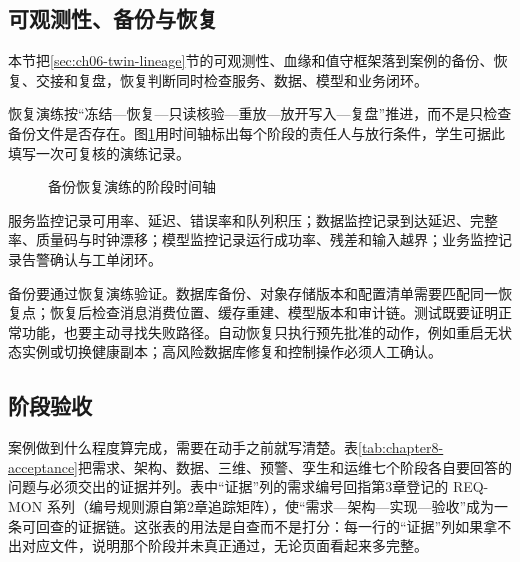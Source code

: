 \subsection{可观测性、备份与恢复}\label{sec:ch08-twin-lineage}

本节把\ref{sec:ch06-twin-lineage}节的可观测性、血缘和值守框架落到案例的备份、恢复、交接和复盘，恢复判断同时检查服务、数据、模型和业务闭环。

恢复演练按“冻结—恢复—只读核验—重放—放开写入—复盘”推进，而不是只检查备份文件是否存在。图\ref{fig:recovery-rehearsal-timeline}用时间轴标出每个阶段的责任人与放行条件，学生可据此填写一次可复核的演练记录。
\begin{figure}[H]
\centering
{}
\caption{备份恢复演练的阶段时间轴}
\label{fig:recovery-rehearsal-timeline}
\end{figure}

服务监控记录可用率、延迟、错误率和队列积压；数据监控记录到达延迟、完整率、质量码与时钟漂移；模型监控记录运行成功率、残差和输入越界；业务监控记录告警确认与工单闭环。

备份要通过恢复演练验证。数据库备份、对象存储版本和配置清单需要匹配同一恢复点；恢复后检查消息消费位置、缓存重建、模型版本和审计链。测试既要证明正常功能，也要主动寻找失败路径\cite{myers2011}。自动恢复只执行预先批准的动作，例如重启无状态实例或切换健康副本；高风险数据库修复和控制操作必须人工确认。

\subsection{阶段验收}

案例做到什么程度算完成，需要在动手之前就写清楚。表\ref{tab:chapter8-acceptance}把需求、架构、数据、三维、预警、孪生和运维七个阶段各自要回答的问题与必须交出的证据并列。表中“证据”列的需求编号回指第3章登记的 REQ-MON 系列（编号规则源自第2章追踪矩阵），使“需求—架构—实现—验收”成为一条可回查的证据链。这张表的用法是自查而不是打分：每一行的“证据”列如果拿不出对应文件，说明那个阶段并未真正通过，无论页面看起来多完整。

